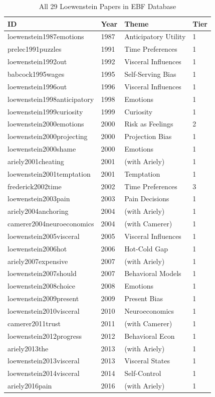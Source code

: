 \begin{table}[htbp]
\centering
\caption{All 29 Loewenstein Papers in EBF Database}
\label{tab:lo-papers}
\renewcommand{\arraystretch}{1.2}
\scriptsize
\begin{tabular}{@{}llll@{}}
\toprule
\textbf{ID} & \textbf{Year} & \textbf{Theme} & \textbf{Tier} \\
\midrule
loewenstein1987emotions & 1987 & Anticipatory Utility & 1 \\
prelec1991puzzles & 1991 & Time Preferences & 1 \\
loewenstein1992out & 1992 & Visceral Influences & 1 \\
babcock1995wages & 1995 & Self-Serving Bias & 1 \\
loewenstein1996out & 1996 & Visceral Influences & 1 \\
loewenstein1998anticipatory & 1998 & Emotions & 1 \\
loewenstein1999curiosity & 1999 & Curiosity & 1 \\
loewenstein2000emotions & 2000 & Risk as Feelings & 2 \\
loewenstein2000projecting & 2000 & Projection Bias & 1 \\
loewenstein2000shame & 2000 & Emotions & 1 \\
ariely2001cheating & 2001 & (with Ariely) & 1 \\
loewenstein2001temptation & 2001 & Temptation & 1 \\
frederick2002time & 2002 & Time Preferences & 3 \\
loewenstein2003pain & 2003 & Pain Decisions & 1 \\
ariely2004anchoring & 2004 & (with Ariely) & 1 \\
camerer2004neuroeconomics & 2004 & (with Camerer) & 1 \\
loewenstein2005visceral & 2005 & Visceral Influences & 1 \\
loewenstein2006hot & 2006 & Hot-Cold Gap & 1 \\
ariely2007expensive & 2007 & (with Ariely) & 1 \\
loewenstein2007should & 2007 & Behavioral Models & 1 \\
loewenstein2008choice & 2008 & Emotions & 1 \\
loewenstein2009present & 2009 & Present Bias & 1 \\
loewenstein2010visceral & 2010 & Neuroeconomics & 1 \\
camerer2011trust & 2011 & (with Camerer) & 1 \\
loewenstein2012progress & 2012 & Behavioral Econ & 1 \\
ariely2013the & 2013 & (with Ariely) & 1 \\
loewenstein2013visceral & 2013 & Visceral States & 1 \\
loewenstein2014visceral & 2014 & Self-Control & 1 \\
ariely2016pain & 2016 & (with Ariely) & 1 \\
\bottomrule
\end{tabular}
\end{table}


